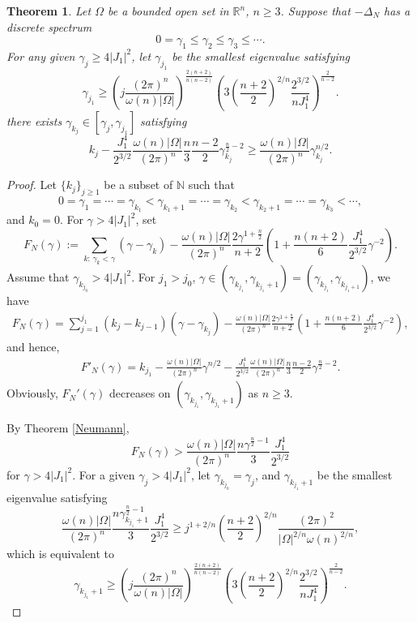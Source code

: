 \documentclass[11pt,twoside, leqno]{article}
\def\rr{{\mathbb R}}
\def\rn{{{\rr}^n}}
\newtheorem{thm}{Theorem}[section]
\numberwithin{equation}{section}
\begin{document}
\begin{thm}\label{thm-infinite-neumann}
Let $\Omega$ be a bounded open set in $\rn$, $n\ge 3$. Suppose that $-\Delta_N$ has a discrete spectrum
$$0= \gamma_1\le \gamma_2\le \gamma_3\le \cdots.$$
For any given $\gamma_j\ge 4|J_1|^2$, let $\gamma_{j_1}$ be the smallest eigenvalue satisfying
$$\gamma_{{j_1}}\ge \left( j\frac{(2\pi)^{n}}{\omega(n)|\Omega|}\right)^{\frac{2(n+2)}{n(n-2)}}  \left( 3\left(\frac{n+2}{2}\right)^{2/n} \frac{2^{3/2}}{nJ_1^4}\right)^{\frac{2}{n-2}}.$$
 there exists $\gamma_{k_j} \in [\gamma_j, \gamma_{j_1}]$ satisfying
$$ k_{j}- \frac{J_1^4}{2^{3/2}} \frac{\omega(n)|\Omega|}{(2\pi)^{n}}\frac{n}{3}\frac{n-2}{2}\gamma_{k_{j}}^{\frac{n}{2}-2} \ge \frac{\omega(n)|\Omega|}{(2\pi)^{n}} \gamma_{k_{j}}^{n/2}. $$
\end{thm}
\begin{proof}
Let $\{k_j\}_{j\ge 1}$ be a subset of $\mathbb{N}$ such that
$$0=\gamma_1=\cdots=\gamma_{k_1}<\gamma_{k_1+1}=\cdots=\gamma_{k_2}<\gamma_{k_2+1}=\cdots=\gamma_{k_3}<\cdots,$$
and $k_0=0$. 
For $\gamma>4|J_1|^2$, set
$$F_N(\gamma):= \sum_{k:\,\gamma_k<\gamma} (\gamma-\gamma_k) -\frac{\omega(n)|\Omega|}{(2\pi)^{n}} \frac{2\gamma^{1+\frac n2}}{n+2}\left(1+\frac{n(n+2) }{6} \frac{J_1^4}{2^{3/2}}\gamma^{-2} \right).$$
Assume that $\gamma_{k_{j_0}}>4|J_1|^2$. For $j_1>j_0$, $\gamma\in (\gamma_{k_{j_1}},\gamma_{k_{j_1}+1})=(\gamma_{k_{j_1}},\gamma_{k_{{j_1}+1}})$, we have
\begin{align}
F_N(\gamma)= \sum_{j=1}^{j_1} (k_j-k_{j-1}) (\gamma-\gamma_{k_j}) -\frac{\omega(n)|\Omega|}{(2\pi)^{n}} \frac{2\gamma^{1+\frac n2}}{n+2}\left(1+\frac{n(n+2) }{6} \frac{J_1^4}{2^{3/2}}\gamma^{-2} \right),
\end{align}
and hence,
\begin{align}\label{decreasing-fn}
F'_N(\gamma)=
k_{j_1} -\frac{\omega(n)|\Omega|}{(2\pi)^{n}} \gamma^{n/2} -  \frac{J_1^4}{2^{3/2}} \frac{\omega(n)|\Omega|}{(2\pi)^{n}}\frac{n}{3}\frac{n-2}{2}\gamma^{\frac{n}{2}-2}.
\end{align}
Obviously, $F_N'(\gamma)$ decreases on $(\gamma_{k_{j_1}},\gamma_{k_{j_1}+1})$ as $n\ge 3$.

By Theorem \ref{Neumann},
$$F_N(\gamma)>\frac{\omega(n)|\Omega|}{(2\pi)^{n}} \frac{n\gamma^{\frac n2-1}}{3}  \frac{J_1^4}{2^{3/2}} $$
for $\gamma>4|J_1|^2$.
For a given $\gamma_j>4|J_1|^2$, let $\gamma_{k_{j_0}}=\gamma_j$, and $\gamma_{k_{j_1}+1}$ be the smallest eigenvalue satisfying
$$\frac{\omega(n)|\Omega|}{(2\pi)^{n}} \frac{n\gamma_{k_{j_1}+1}^{\frac n2-1}}{3} \frac{J_1^4}{2^{3/2}}\ge j^{1+2/n}\left(\frac{n+2}{2}\right)^{2/n} \frac{(2\pi)^2}{ |\Omega|^{2/n}\omega(n)^{2/n}},$$
which is equivalent to
$$\gamma_{k_{j_1}+1}\ge \left( j\frac{(2\pi)^{n}}{\omega(n)|\Omega|}\right)^{\frac{2(n+2)}{n(n-2)}}  \left( 3\left(\frac{n+2}{2}\right)^{2/n} \frac{2^{3/2}}{nJ_1^4}\right)^{\frac{2}{n-2}}.$$


\end{proof}
\end{document}
